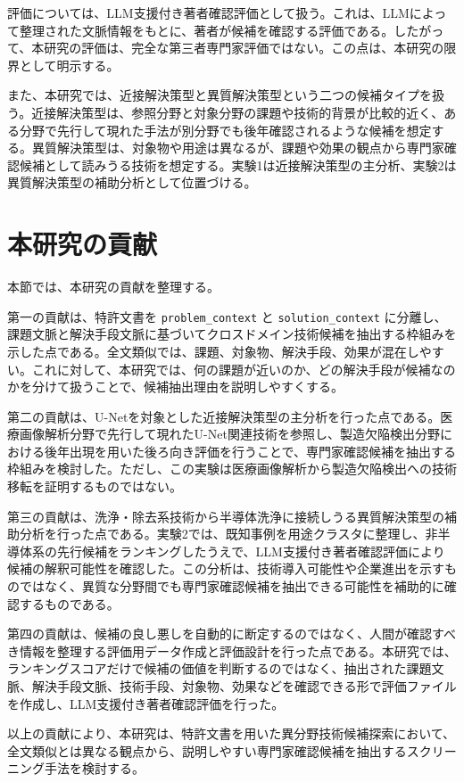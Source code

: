評価については、LLM支援付き著者確認評価として扱う。これは、LLMによって整理された文脈情報をもとに、著者が候補を確認する評価である。したがって、本研究の評価は、完全な第三者専門家評価ではない。この点は、本研究の限界として明示する。

また、本研究では、近接解決策型と異質解決策型という二つの候補タイプを扱う。近接解決策型は、参照分野と対象分野の課題や技術的背景が比較的近く、ある分野で先行して現れた手法が別分野でも後年確認されるような候補を想定する。異質解決策型は、対象物や用途は異なるが、課題や効果の観点から専門家確認候補として読みうる技術を想定する。実験1は近接解決策型の主分析、実験2は異質解決策型の補助分析として位置づける。

\section{本研究の貢献}

本節では、本研究の貢献を整理する。

第一の貢献は、特許文書を \texttt{problem\_context} と \texttt{solution\_context} に分離し、課題文脈と解決手段文脈に基づいてクロスドメイン技術候補を抽出する枠組みを示した点である。全文類似では、課題、対象物、解決手段、効果が混在しやすい。これに対して、本研究では、何の課題が近いのか、どの解決手段が候補なのかを分けて扱うことで、候補抽出理由を説明しやすくする。

第二の貢献は、U-Netを対象とした近接解決策型の主分析を行った点である。医療画像解析分野で先行して現れたU-Net関連技術を参照し、製造欠陥検出分野における後年出現を用いた後ろ向き評価を行うことで、専門家確認候補を抽出する枠組みを検討した。ただし、この実験は医療画像解析から製造欠陥検出への技術移転を証明するものではない。

第三の貢献は、洗浄・除去系技術から半導体洗浄に接続しうる異質解決策型の補助分析を行った点である。実験2では、既知事例を用途クラスタに整理し、非半導体系の先行候補をランキングしたうえで、LLM支援付き著者確認評価により候補の解釈可能性を確認した。この分析は、技術導入可能性や企業進出を示すものではなく、異質な分野間でも専門家確認候補を抽出できる可能性を補助的に確認するものである。

第四の貢献は、候補の良し悪しを自動的に断定するのではなく、人間が確認すべき情報を整理する評価用データ作成と評価設計を行った点である。本研究では、ランキングスコアだけで候補の価値を判断するのではなく、抽出された課題文脈、解決手段文脈、技術手段、対象物、効果などを確認できる形で評価ファイルを作成し、LLM支援付き著者確認評価を行った。

以上の貢献により、本研究は、特許文書を用いた異分野技術候補探索において、全文類似とは異なる観点から、説明しやすい専門家確認候補を抽出するスクリーニング手法を検討する。

